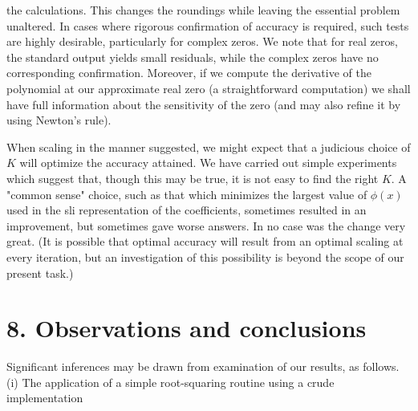 \documentclass[10pt]{article}
\begin{document}
the calculations. This changes the roundings while leaving the essential problem unaltered. In cases where rigorous confirmation of accuracy is required, such tests are highly desirable, particularly for complex zeros. We note that for real zeros, the standard output yields small residuals, while the complex zeros have no corresponding confirmation. Moreover, if we compute the derivative of the polynomial at our approximate real zero (a straightforward computation) we shall have full information about the sensitivity of the zero (and may also refine it by using Newton's rule).

When scaling in the manner suggested, we might expect that a judicious choice of $K$ will optimize the accuracy attained. We have carried out simple experiments which suggest that, though this may be true, it is not easy to find the right $K$. A "common sense" choice, such as that which minimizes the largest value of $\phi(x)$ used in the sli representation of the coefficients, sometimes resulted in an improvement, but sometimes gave worse answers. In no case was the change very great. (It is possible that optimal accuracy will result from an optimal scaling at every iteration, but an investigation of this possibility is beyond the scope of our present task.)

\section*{8. Observations and conclusions}
Significant inferences may be drawn from examination of our results, as follows.\\
(i) The application of a simple root-squaring routine using a crude implementation
\end{document}
